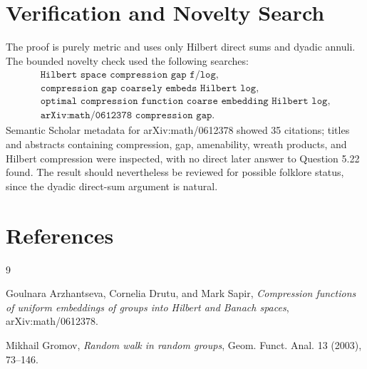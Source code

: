 \documentclass[11pt]{article}
\begin{document}
\section*{Verification and Novelty Search}

The proof is purely metric and uses only Hilbert direct sums and dyadic
annuli.  The bounded novelty check used the following searches:
\[
\begin{gathered}
\texttt{Hilbert space compression gap f/log},\\
\texttt{compression gap coarsely embeds Hilbert log},\\
\texttt{optimal compression function coarse embedding Hilbert log},\\
\texttt{arXiv:math/0612378 compression gap}.
\end{gathered}
\]
Semantic Scholar metadata for arXiv:math/0612378 showed 35 citations; titles
and abstracts containing compression, gap, amenability, wreath products, and
Hilbert compression were inspected, with no direct later answer to Question
5.22 found.  The result should nevertheless be reviewed for possible folklore
status, since the dyadic direct-sum argument is natural.

\section*{References}

\begin{thebibliography}{9}

Goulnara Arzhantseva, Cornelia Drutu, and Mark Sapir,
\emph{Compression functions of uniform embeddings of groups into Hilbert and
Banach spaces}, arXiv:math/0612378.

Mikhail Gromov,
\emph{Random walk in random groups}, Geom. Funct. Anal. 13 (2003),
73--146.

\end{thebibliography}
\end{document}
